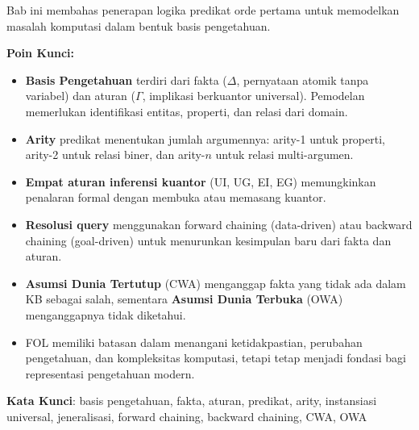 \documentclass[../main]{subfiles}
\begin{document}

\begin{rangkuman}
Bab ini membahas penerapan logika predikat orde pertama untuk memodelkan masalah komputasi dalam bentuk basis pengetahuan.

\textbf{Poin Kunci:}
\begin{itemize}
  \item \textbf{Basis Pengetahuan} terdiri dari fakta ($\Delta$, pernyataan atomik tanpa variabel) dan aturan ($\Gamma$, implikasi berkuantor universal). Pemodelan memerlukan identifikasi entitas, properti, dan relasi dari domain.
  \item \textbf{Arity} predikat menentukan jumlah argumennya: arity-1 untuk properti, arity-2 untuk relasi biner, dan arity-$n$ untuk relasi multi-argumen.
  \item \textbf{Empat aturan inferensi kuantor} (UI, UG, EI, EG) memungkinkan penalaran formal dengan membuka atau memasang kuantor.
  \item \textbf{Resolusi query} menggunakan forward chaining (data-driven) atau backward chaining (goal-driven) untuk menurunkan kesimpulan baru dari fakta dan aturan.
  \item \textbf{Asumsi Dunia Tertutup} (CWA) menganggap fakta yang tidak ada dalam KB sebagai salah, sementara \textbf{Asumsi Dunia Terbuka} (OWA) menganggapnya tidak diketahui.
  \item FOL memiliki batasan dalam menangani ketidakpastian, perubahan pengetahuan, dan kompleksitas komputasi, tetapi tetap menjadi fondasi bagi representasi pengetahuan modern.
\end{itemize}

\textbf{Kata Kunci}: basis pengetahuan, fakta, aturan, predikat, arity, instansiasi universal, jeneralisasi, forward chaining, backward chaining, CWA, OWA
\end{rangkuman}

\ifSubfilesClassLoaded{
  \renewcommand{\bibname}{Daftar Pustaka}
  
  
}{}
\end{document}
